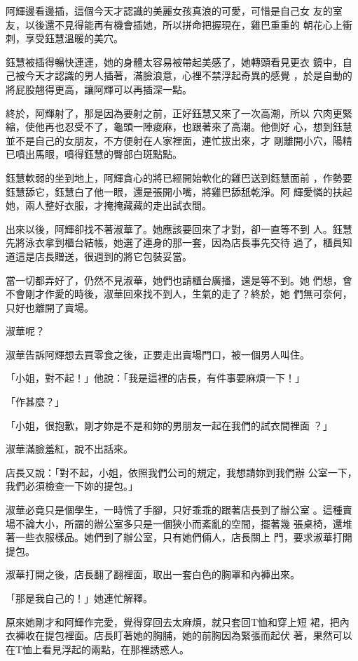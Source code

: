 阿輝邊看邊插，這個今天才認識的美麗女孩真浪的可愛，可惜是自己女
友的室友，以後還不見得能再有機會插她，所以拼命把握現在，雞巴重重的
朝花心上衝刺，享受鈺慧溫暖的美穴。

鈺慧被插得暢快連連，她的身體太容易被帶起美感了，她轉頭看見更衣
鏡中，自己被今天才認識的男人插著，滿臉浪意，心裡不禁浮起奇異的感覺
，於是自動的將屁股翹得更高，讓阿輝可以再插深一點。

終於，阿輝射了，那是因為要射之前，正好鈺慧又來了一次高潮，所以
穴肉更緊縮，使他再也忍受不了，龜頭一陣痠麻，也跟著來了高潮。他倒好
心，想到鈺慧並不是自己的女朋友，不方便射在人家裡面，連忙拔出來，才
剛離開小穴，陽精已噴出馬眼，噴得鈺慧的臀部白斑點點。

鈺慧軟弱的坐到地上，阿輝貪心的將已經開始軟化的雞巴送到鈺慧面前
，作勢要鈺慧舔它，鈺慧白了他一眼，還是張開小嘴，將雞巴舔舐乾淨。阿
輝愛憐的扶起她，兩人整好衣服，才掩掩藏藏的走出試衣間。

出來以後，阿輝卻找不著淑華了。她應該要回來了才對，卻一直等不到
人。鈺慧先將泳衣拿到櫃台結帳，她選了連身的那一套，因為店長事先交待
過了，櫃員知道這是店長贈送，很週到的將它包裝妥當。

當一切都弄好了，仍然不見淑華，她們也請櫃台廣播，還是等不到。她
們想，會不會剛才作愛的時後，淑華回來找不到人，生氣的走了？終於，她
們無可奈何，只好也離開了賣場。

淑華呢？

淑華告訴阿輝想去買零食之後，正要走出賣場門口，被一個男人叫住。

「小姐，對不起！」他說：「我是這裡的店長，有件事要麻煩一下！」

「作甚麼？」

「小姐，很抱歉，剛才妳是不是和妳的男朋友一起在我們的試衣間裡面
？」

淑華滿臉羞紅，說不出話來。

店長又說：「對不起，小姐，依照我們公司的規定，我想請妳到我們辦
公室一下，我們必須檢查一下妳的提包。」

淑華必竟只是個學生，一時慌了手腳，只好乖乖的跟著店長到了辦公室
。這種賣場不論大小，所謂的辦公室多只是一個狹小而紊亂的空間，擺著幾
張桌椅，還堆著一些衣服樣品。她們到了辦公室，只有她們倆人，店長關上
門，要求淑華打開提包。

淑華打開之後，店長翻了翻裡面，取出一套白色的胸罩和內褲出來。

「那是我自己的！」她連忙解釋。

原來她剛才和阿輝作完愛，覺得穿回去太麻煩，就只套回T恤和穿上短
裙，把內衣褲收在提包裡面。店長盯著她的胸脯，她的前胸因為緊張而起伏
著，果然可以在T恤上看見浮起的兩點，在那裡誘惑人。

